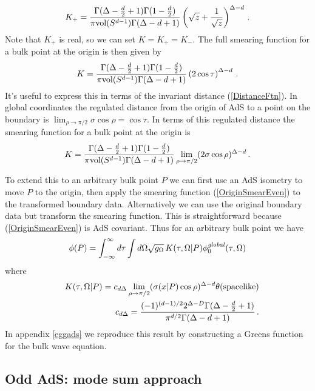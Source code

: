 \documentclass[12pt]{article}
\newcommand{\be}{\begin{equation}}
\newcommand{\ee}{\end{equation}}
\newcommand{\phinotg} [1]{{\phi_{0#1}^{\it global}}}
\begin{document}
\begin{equation}
K_+ = {\Gamma(\Delta - {d \over 2} + 1) \Gamma(1 - {d \over 2}) \over \pi {\rm vol}(S^{d-1}) \Gamma(\Delta - d + 1)}
\left(\sqrt{z} + {1 \over \sqrt{z}}\right)^{\Delta - d}\,.
\end{equation}
Note that $K_+$ is real, so we can set $K = K_+ = K_-$.  The full smearing function for a bulk point at the origin
is then given by
\be
K = {\Gamma(\Delta - {d \over 2} + 1) \Gamma(1 - {d \over 2}) \over \pi {\rm vol}(S^{d-1}) \Gamma(\Delta - d + 1)}
\left(2 \cos \tau \right)^{\Delta - d}\,.
\ee
It's useful to express this in terms of the invariant distance (\ref{DistanceFtn}).
In global coordinates the regulated distance from the origin of AdS to a point on the boundary is
$\lim_{\rho \rightarrow \pi/2} \sigma \cos \rho = \cos \tau$.  In terms of this regulated distance the smearing
function for a bulk point at the origin is
\be
\label{OriginSmearEven}
K = {\Gamma(\Delta - {d \over 2} + 1) \Gamma(1 - {d \over 2}) \over \pi {\rm vol}(S^{d-1}) \Gamma(\Delta - d + 1)}
\lim_{\rho \rightarrow \pi/2} (2 \sigma \cos \rho)^{\Delta - d}\,.
\ee

To extend this to an arbitrary bulk point $P$ we can first use an AdS isometry to move $P$ to the origin, then apply
the smearing function (\ref{OriginSmearEven}) to the transformed boundary data.  Alternatively we can use the original
boundary data but transform the smearing function.  This is straightforward because (\ref{OriginSmearEven}) is
AdS covariant.  Thus for an arbitrary bulk point we have
\begin{equation}
\phi(P) = \int_{-\infty}^{\infty} d\tau \int d\Omega \sqrt{g_\Omega} \, K(\tau,\Omega \vert P) \phinotg{}(\tau,\Omega)
\end{equation}
where
\begin{eqnarray}
\nonumber
&&K(\tau,\Omega \vert P) = c_{d \Delta} \lim_{\rho \rightarrow \pi/2} (\sigma(x \vert P) \cos \rho)^{\Delta - d}
\theta({\rm spacelike}) \\
\label{GlobalEvenSmear}
&& c_{d \Delta} = {(-1)^{(d - 1)/2} 2^{\Delta - D} \Gamma(\Delta - {d \over 2} + 1)
\over \pi^{d/2} \Gamma(\Delta - d + 1)}\,.
\end{eqnarray}
In appendix \ref{eggads} we reproduce this result by constructing a Greens function for the bulk wave equation.

\subsection{Odd AdS: mode sum approach} \label{ogads}
\end{document}
